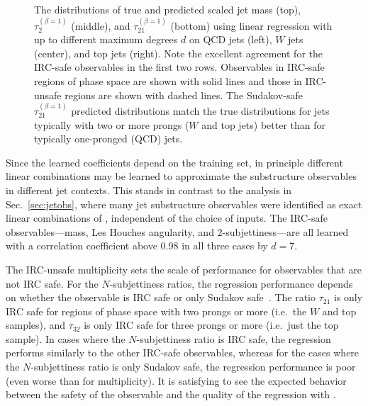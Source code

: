 \documentclass[letterpaper,11pt]{article}
\DeclareRobustCommand{\Sec}[1]{Sec.~\ref{#1}}
\newcommand{\Bs}{\text{EFPs}\xspace}
\begin{document}
\begin{figure}[t]
\centering
{}
\\
\\
\caption{The distributions of true and predicted scaled jet mass (top), $\tau_2^{(\beta=1)}$ (middle), and $\tau_{21}^{(\beta=1)}$ (bottom) using linear regression with \Bs up to different maximum degrees $d$ on QCD jets (left), $W$ jets (center), and top jets (right). Note the excellent agreement for the IRC-safe observables in the first two rows. Observables in IRC-safe regions of phase space are shown with solid lines and those in IRC-unsafe regions are shown with dashed lines. The Sudakov-safe $\tau_{21}^{(\beta=1)}$ predicted distributions match the true distributions for jets typically with two or more prongs ($W$ and top jets) better than for typically one-pronged (QCD) jets.}
\label{fig:reghists}
\end{figure}

Since the learned coefficients depend on the training set, in principle different linear combinations may be learned to approximate the substructure observables in different jet contexts.
%
This stands in contrast to the analysis in \Sec{sec:jetobs}, where many jet substructure observables were identified as exact linear combinations of \Bs, independent of the choice of inputs.
%
The IRC-safe observables---mass, Les Houches angularity, and $2$-subjettiness---are all learned with a correlation coefficient above 0.98 in all three cases by $d=7$.

The IRC-unsafe multiplicity sets the scale of performance for observables that are not IRC safe.
%
For the $N$-subjettiness ratios, the regression performance depends on whether the observable is IRC safe or only Sudakov safe~\cite{Larkoski:2013paa,Larkoski:2015lea}.
%
The ratio $\tau_{21}$ is only IRC safe for regions of phase space with two prongs or more (i.e.\ the $W$ and top samples), and $\tau_{32}$ is only IRC safe for three prongs or more (i.e.\ just the top sample).
%
In cases where the $N$-subjettiness ratio is IRC safe, the regression performs similarly to the other IRC-safe observables, whereas for the cases where the $N$-subjettiness ratio is only Sudakov safe, the regression performance is poor (even worse than for multiplicity).
%
It is satisfying to see the expected behavior between the safety of the observable and the quality of the regression with \Bs.
\end{document}
